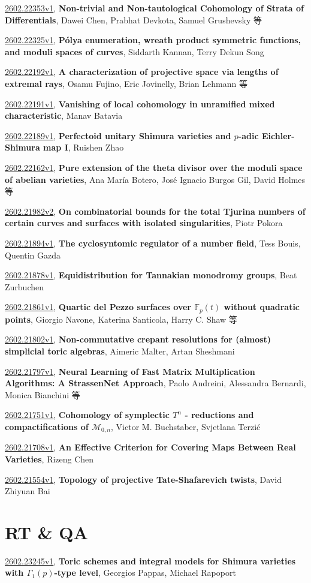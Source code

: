 \documentclass[9pt, a4paper]{article}
\theoremstyle{plain}
\theoremstyle{definition}
\theoremstyle{remark}
\newcommand{\arxiv}[3]{\href{https://arxiv.org/abs/#1}{#1}, \textbf{\textcolor{arxivblue}{#2}}, #3}
\begin{document}
\arxiv{2602.22353v1}{Non-trivial and Non-tautological Cohomology of Strata of Differentials}{Dawei Chen, Prabhat Devkota, Samuel Grushevsky 等}

\arxiv{2602.22325v1}{Pólya enumeration, wreath product symmetric functions, and moduli spaces of curves}{Siddarth Kannan, Terry Dekun Song}

\arxiv{2602.22192v1}{A characterization of projective space via lengths of extremal rays}{Osamu Fujino, Eric Jovinelly, Brian Lehmann 等}

\arxiv{2602.22191v1}{Vanishing of local cohomology in unramified mixed characteristic}{Manav Batavia}

\arxiv{2602.22189v1}{Perfectoid unitary Shimura varieties and $p$-adic Eichler-Shimura map I}{Ruishen Zhao}

\arxiv{2602.22162v1}{Pure extension of the theta divisor over the moduli space of abelian varieties}{Ana María Botero, José Ignacio Burgos Gil, David Holmes 等}

\arxiv{2602.21982v2}{On combinatorial bounds for the total Tjurina numbers of certain curves and surfaces with isolated singularities}{Piotr Pokora}

\arxiv{2602.21894v1}{The cyclosyntomic regulator of a number field}{Tess Bouis, Quentin Gazda}

\arxiv{2602.21878v1}{Equidistribution for Tannakian monodromy groups}{Beat Zurbuchen}

\arxiv{2602.21861v1}{Quartic del Pezzo surfaces over $\mathbb{F}_p(t)$ without quadratic points}{Giorgio Navone, Katerina Santicola, Harry C. Shaw 等}

\arxiv{2602.21802v1}{Non-commutative crepant resolutions for (almost) simplicial toric algebras}{Aimeric Malter, Artan Sheshmani}

\arxiv{2602.21797v1}{Neural Learning of Fast Matrix Multiplication Algorithms: A StrassenNet Approach}{Paolo Andreini, Alessandra Bernardi, Monica Bianchini 等}

\arxiv{2602.21751v1}{Cohomology of symplectic $T^n$ - reductions and compactifications of $\mathcal{M}_{0, n}$}{Victor M. Buchstaber, Svjetlana Terzić}

\arxiv{2602.21708v1}{An Effective Criterion for Covering Maps Between Real Varieties}{Rizeng Chen}

\arxiv{2602.21554v1}{Topology of projective Tate-Shafarevich twists}{David Zhiyuan Bai}


\section{RT \& QA}
\arxiv{2602.23245v1}{Toric schemes and integral models for Shimura varieties with $Γ_1(p)$-type level}{Georgios Pappas, Michael Rapoport}
\end{document}
